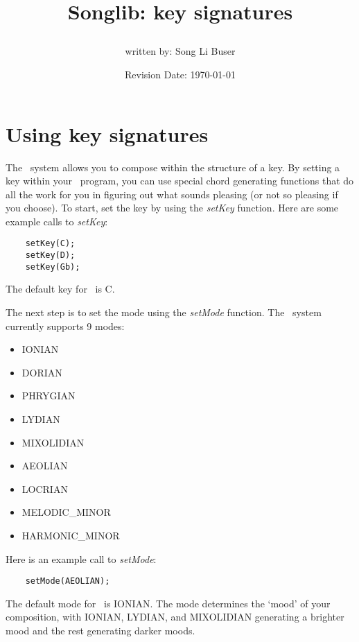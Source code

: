 \documentclass{article}
\title{Songlib: key signatures\\
\date{Revision Date: \today}}
\author{written by: Song Li Buser}
\begin{document}
\maketitle

\W\subsubsection*{}
\W\htmlrule

\section*{Using key signatures}

The \songlib\ system allows you to compose 
within the structure of a key. By setting
a key within your \songlib\ program, you 
can use special chord generating functions
that do all the work for you in figuring
out what sounds pleasing (or not so pleasing
if you choose). To start, set the key 
by using the {\it setKey} function. Here are
some example calls to {\it setKey}:

\begin{verbatim}
    setKey(C);
    setKey(D);
    setKey(Gb);
\end{verbatim}

The default key for \songlib\ is C.

The next step is to set the mode using
the {\it setMode} function. The \songlib\ system
currently supports 9 modes:

\begin{itemize}
\item
    IONIAN
\item
    DORIAN
\item
    PHRYGIAN
\item
    LYDIAN
\item
    MIXOLIDIAN
\item
    AEOLIAN
\item
    LOCRIAN
\item
    MELODIC\_MINOR
\item
    HARMONIC\_MINOR
\end{itemize}

Here is an example call to {\it setMode}:

\begin{verbatim}
    setMode(AEOLIAN);
\end{verbatim}

The default mode for \songlib\ is {\sc IONIAN}.
The mode determines the `mood' of your composition,
with IONIAN, LYDIAN, and MIXOLIDIAN generating
a brighter mood and the rest generating darker moods.
\end{document}
